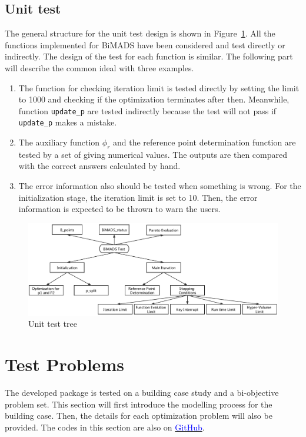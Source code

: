 \documentclass[11pt,oneside,onecolumn,openright]{article}
\begin{document}
  \subsection{Unit test}
  The general structure for the unit test design is shown in Figure~\ref{fig:test_tree}. All the functions implemented for BiMADS have been considered and test directly or indirectly. The design of the test for each function is similar. The following part will describe the common ideal with three examples.

  \begin{enumerate}
  \item The function for checking iteration limit is tested directly by setting the limit to 1000 and checking if the optimization terminates after then. Meanwhile, function \verb|update_p| are tested indirectly because the test will not pass if \verb|update_p| makes a mistake.
  \item The auxiliary function $\phi_r$ and the reference point determination function are tested by a set of giving numerical values. The outputs are then compared with the correct answers calculated by hand.
  \item The error information also should be tested when something is wrong. For the initialization stage, the iteration limit is set to 10. Then, the error information is expected to be thrown to warn the users.
  \end{enumerate}
    \begin{figure}[t]
    \centering
    \includegraphics[width=16cm]{fig/test_tree.pdf}
    \caption{Unit test tree}
    \label{fig:test_tree}
    \end{figure}

\section{Test Problems}\label{sec:test}
  The developed package is tested on a building case study and a bi-objective problem set. This section will first introduce the modelling process for the building case. Then, the details for each optimization problem will also be provided. The codes in this section are also on \href{https://github.com/amazing0844/test_julia}{\textcolor{blue}{GitHub}}.
\end{document}
